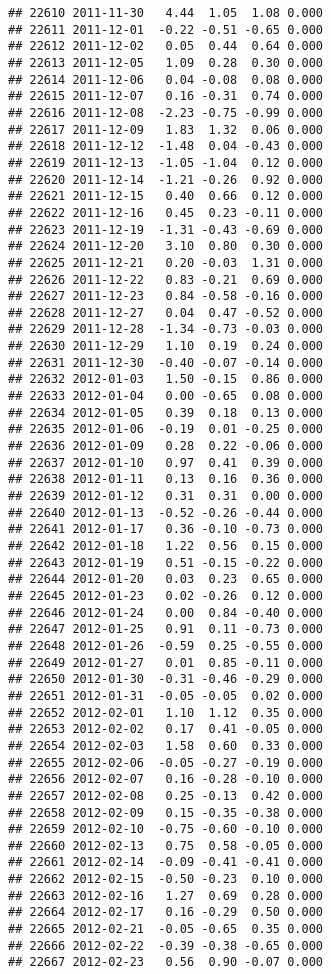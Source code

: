 \documentclass[
]{article}
\begin{document}
\begin{verbatim}
## 22610 2011-11-30   4.44  1.05  1.08 0.000
## 22611 2011-12-01  -0.22 -0.51 -0.65 0.000
## 22612 2011-12-02   0.05  0.44  0.64 0.000
## 22613 2011-12-05   1.09  0.28  0.30 0.000
## 22614 2011-12-06   0.04 -0.08  0.08 0.000
## 22615 2011-12-07   0.16 -0.31  0.74 0.000
## 22616 2011-12-08  -2.23 -0.75 -0.99 0.000
## 22617 2011-12-09   1.83  1.32  0.06 0.000
## 22618 2011-12-12  -1.48  0.04 -0.43 0.000
## 22619 2011-12-13  -1.05 -1.04  0.12 0.000
## 22620 2011-12-14  -1.21 -0.26  0.92 0.000
## 22621 2011-12-15   0.40  0.66  0.12 0.000
## 22622 2011-12-16   0.45  0.23 -0.11 0.000
## 22623 2011-12-19  -1.31 -0.43 -0.69 0.000
## 22624 2011-12-20   3.10  0.80  0.30 0.000
## 22625 2011-12-21   0.20 -0.03  1.31 0.000
## 22626 2011-12-22   0.83 -0.21  0.69 0.000
## 22627 2011-12-23   0.84 -0.58 -0.16 0.000
## 22628 2011-12-27   0.04  0.47 -0.52 0.000
## 22629 2011-12-28  -1.34 -0.73 -0.03 0.000
## 22630 2011-12-29   1.10  0.19  0.24 0.000
## 22631 2011-12-30  -0.40 -0.07 -0.14 0.000
## 22632 2012-01-03   1.50 -0.15  0.86 0.000
## 22633 2012-01-04   0.00 -0.65  0.08 0.000
## 22634 2012-01-05   0.39  0.18  0.13 0.000
## 22635 2012-01-06  -0.19  0.01 -0.25 0.000
## 22636 2012-01-09   0.28  0.22 -0.06 0.000
## 22637 2012-01-10   0.97  0.41  0.39 0.000
## 22638 2012-01-11   0.13  0.16  0.36 0.000
## 22639 2012-01-12   0.31  0.31  0.00 0.000
## 22640 2012-01-13  -0.52 -0.26 -0.44 0.000
## 22641 2012-01-17   0.36 -0.10 -0.73 0.000
## 22642 2012-01-18   1.22  0.56  0.15 0.000
## 22643 2012-01-19   0.51 -0.15 -0.22 0.000
## 22644 2012-01-20   0.03  0.23  0.65 0.000
## 22645 2012-01-23   0.02 -0.26  0.12 0.000
## 22646 2012-01-24   0.00  0.84 -0.40 0.000
## 22647 2012-01-25   0.91  0.11 -0.73 0.000
## 22648 2012-01-26  -0.59  0.25 -0.55 0.000
## 22649 2012-01-27   0.01  0.85 -0.11 0.000
## 22650 2012-01-30  -0.31 -0.46 -0.29 0.000
## 22651 2012-01-31  -0.05 -0.05  0.02 0.000
## 22652 2012-02-01   1.10  1.12  0.35 0.000
## 22653 2012-02-02   0.17  0.41 -0.05 0.000
## 22654 2012-02-03   1.58  0.60  0.33 0.000
## 22655 2012-02-06  -0.05 -0.27 -0.19 0.000
## 22656 2012-02-07   0.16 -0.28 -0.10 0.000
## 22657 2012-02-08   0.25 -0.13  0.42 0.000
## 22658 2012-02-09   0.15 -0.35 -0.38 0.000
## 22659 2012-02-10  -0.75 -0.60 -0.10 0.000
## 22660 2012-02-13   0.75  0.58 -0.05 0.000
## 22661 2012-02-14  -0.09 -0.41 -0.41 0.000
## 22662 2012-02-15  -0.50 -0.23  0.10 0.000
## 22663 2012-02-16   1.27  0.69  0.28 0.000
## 22664 2012-02-17   0.16 -0.29  0.50 0.000
## 22665 2012-02-21  -0.05 -0.65  0.35 0.000
## 22666 2012-02-22  -0.39 -0.38 -0.65 0.000
## 22667 2012-02-23   0.56  0.90 -0.07 0.000

\end{verbatim}
\end{document}
